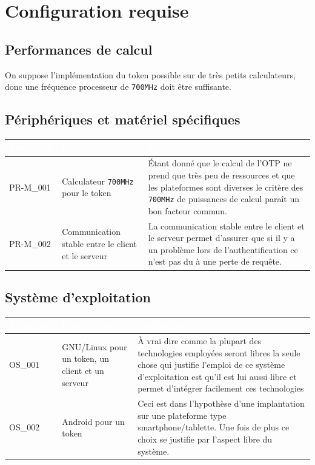 \documentclass{"../../res/univ-projet"}
\begin{document}
\section{Configuration requise}
\subsection{Performances de calcul}
On suppose l'implémentation du token possible sur de très petits 
calculateurs, donc une fréquence processeur de \verb?700MHz? doit être suffisante.

\subsection{Périphériques et matériel spécifiques}
\begin{tabular}{|p{}|p{}|p{}|}
    \hline
    \rowcolor{gray}
    \textcolor{white}{\bfseries Identifiant} & 
    \textcolor{white}{\bfseries Description} &
    \textcolor{white}{\bfseries Justification} \\
    \hline
    PR-M\_001 &
    Calculateur \verb?700MHz? pour le token &
    Étant donn\'e que le calcul de l'OTP ne prend que très peu de ressources
            et que les plateformes sont diverses le critère des \verb?700MHz? de puissances
            de calcul paraît un bon facteur commun.\\
    \hline
    PR-M\_002 &
    Communication stable entre le client et le serveur &
    La communication stable entre le client et le serveur permet d'assurer que si
            il y a un problème lors de l'authentification ce n'est pas du à une perte de
            requête.\\
    \hline
\end{tabular}

\subsection{Système d'exploitation}
\begin{tabular}{|p{}|p{}|p{}|}
    \hline
    \rowcolor{gray}
    \textcolor{white}{\bfseries Identifiant} & 
    \textcolor{white}{\bfseries Description} &
    \textcolor{white}{\bfseries Justification} \\
    \hline
    OS\_001& 
    GNU/Linux pour un token, un client et un serveur&
    À vrai dire comme la plupart des technologies employ\'ees seront libres
    la seule chose qui justifie l'emploi de ce système d'exploitation
    est qu'il est lui aussi libre et permet d'int\'egrer facilement ces technologies\\
    \hline
    OS\_002&
    Android pour un token&
    Ceci est dans l'hypothèse d'une implantation sur une plateforme type
    smartphone/tablette. Une fois de plus ce choix se justifie par
    l'aspect libre du système.\\
    \hline
\end{tabular}
\end{document}
